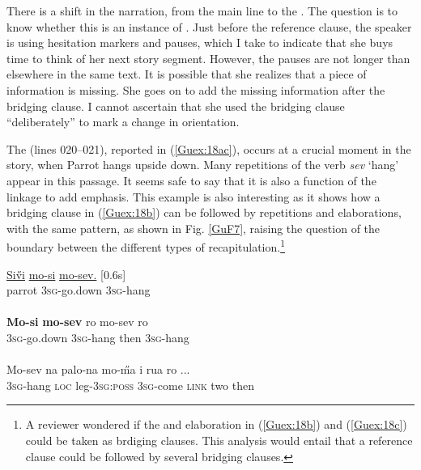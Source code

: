 \documentclass[output=paper]{LSP/langsci}
\begin{document}
There is a shift in the narration, from the main line to the . The question is to know whether this is an instance of . Just before the reference clause, the speaker is using hesitation markers and pauses, which I take to indicate that she buys time to think of her next story segment. However, the pauses are not longer than elsewhere in the same text. It is possible that she realizes that a piece of information is missing. She goes on to add the missing information after the bridging clause. I cannot ascertain that she used the bridging clause ``deliberately'' to mark a change in orientation. 

The  (lines 020--021), reported in (\ref{Guex:18ac}), occurs at a crucial moment in the story, when Parrot hangs upside down. Many repetitions of the verb \textit{sev} `hang' appear in this passage. It seems safe to say that it is also a function of the linkage to add emphasis. This example is also interesting as it shows how a bridging clause in (\ref{Guex:18b}) can be followed by repetitions and elaborations, with the same  pattern, as shown in Fig. \ref{GuF7}, raising the question of the boundary between the different types of recapitulation.\footnote{A reviewer wondered if the  and elaboration in (\ref{Guex:18b}) and (\ref{Guex:18c}) could be taken as brdiging clauses. This analysis would entail that a reference clause could be followed by several bridging clauses.}

\begin{exe}
\ex \label{Guex:18ac}
\begin{xlist}
\ex \label{Guex:18a}
\gll \underline{Si\H{v}i}  \underline{mo-si}           \underline{mo-sev.}           [0.6s]\\
parrot  \textsc{3sg}-go.down   \textsc{3sg}-hang \\
\glt {}\\
\ex \label{Guex:18b}
\gll \textbf{Mo-si}          \textbf{mo-sev}       ro              mo-sev       ro\\
\textsc{3sg}-go.down   \textsc{3sg}-hang   then  \textsc{3sg}-hang\\
\glt {}\\
\ex \label{Guex:18c}
\gll   Mo-sev    na     palo-na           mo-\H{m}a        i     rua   ro  ...\\     	       
\textsc{3sg}-hang  \textsc{loc}    leg-\textsc{3sg:poss}   \textsc{3sg}-come  \textsc{link}   two   then \\
\glt {} 
\end{xlist}
\end{exe}
\end{document}
